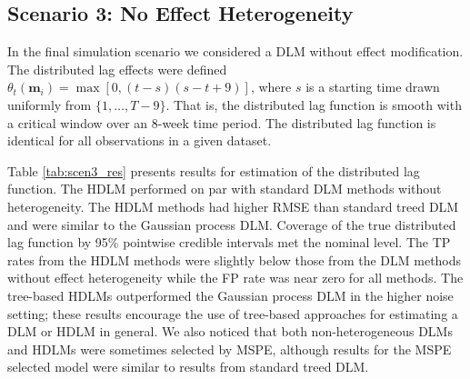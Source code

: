 \documentclass[12pt]{article}
\begin{document}
\subsection{Scenario 3: No Effect Heterogeneity}
In the final simulation scenario we considered a DLM without effect modification. The distributed lag effects were defined $\theta_t(\mathbf{m}_i)=\max[0,(t-s)(s-t+9)]$, where $s$ is a starting time drawn uniformly from $\{1,\ldots,T-9\}$. That is, the distributed lag function is smooth with a critical window over an 8-week time period. The distributed lag function is identical for all observations in a given dataset.

Table \ref{tab:scen3_res} presents results for estimation of the distributed lag function. The HDLM performed on par with standard DLM methods without heterogeneity. The HDLM methods had higher RMSE than standard treed DLM and were similar to the Gaussian process DLM. Coverage of the true distributed lag function by 95\% pointwise credible intervals met the nominal level. The TP rates from the HDLM methods were slightly below those from the DLM methods without effect heterogeneity while the FP rate was near zero for all methods. The tree-based HDLMs outperformed the Gaussian process DLM in the higher noise setting; these results encourage the use of tree-based approaches for estimating a DLM or HDLM in general. We also noticed that both non-heterogeneous DLMs and HDLMs were sometimes selected by MSPE, although results for the MSPE selected model were similar to results from standard treed DLM.
\end{document}
